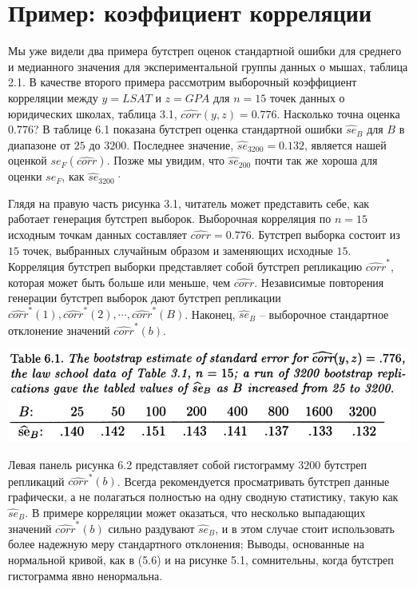 \section{Пример: коэффициент корреляции}

Мы уже видели два примера бутстреп оценок стандартной ошибки для среднего и медианного значения для экспериментальной группы данных о мышах, таблица 2.1. В качестве второго примера рассмотрим выборочный коэффициент корреляции между $y = LSAT$ и $z = GPA$ для $n = 15$ точек данных о юридических школах, таблица 3.1, $\widehat{corr}(y, z) =0.776$. Насколько точна оценка $0.776$? В таблице 6.1 показана бутстреп оценка стандартной ошибки $\widehat{se}_B$ для $B$ в диапазоне от $25$ до $3200$. Последнее значение, $\widehat{se}_{3200} = 0.132$, является нашей оценкой $se_F (\widehat{corr})$. Позже мы увидим, что $\widehat{se}_{200}$ почти так же хороша для оценки $se_F$, как $\widehat{se}_{3200}$· 

Глядя на правую часть рисунка 3.1, читатель может представить себе, как работает генерация бутстреп выборок. Выборочная корреляция по $n = 15$ исходным точкам данных составляет $\widehat{corr} = 0.776$. Бутстреп выборка состоит из $15$ точек, выбранных случайным образом и заменяющих исходные $15$. Корреляция бутстреп выборки представляет собой бутстреп репликацию $\widehat{corr}^*$, которая может быть больше или меньше, чем $\widehat{corr}$. Независимые повторения генерации бутстреп выборок дают бутстреп репликации $\widehat{corr}^*(1),\widehat{corr}^*(2),\cdots,\widehat{corr}^*(B)$. Наконец, $\widehat{se}_B$ -- выборочное стандартное отклонение значений $\widehat{corr}^*(b)$. 
\newline

\noindent
\includegraphics[width=\linewidth]{5/t61.png}
\newline

Левая панель рисунка 6.2 представляет собой гистограмму $3200$ бутстреп репликаций $\widehat{corr}^*(b)$. Всегда рекомендуется просматривать бутстреп данные графически, а не полагаться полностью на одну сводную статистику, такую как $\widehat{se}_B$. В примере корреляции может оказаться, что несколько выпадающих значений $\widehat{corr}^*(b)$ сильно раздувают $\widehat{se}_B$, и в этом случае стоит использовать более надежную меру стандартного отклонения; Выводы, основанные на нормальной кривой, как в (5.6) и на рисунке 5.1, сомнительны, когда бутстреп гистограмма явно ненормальна.

